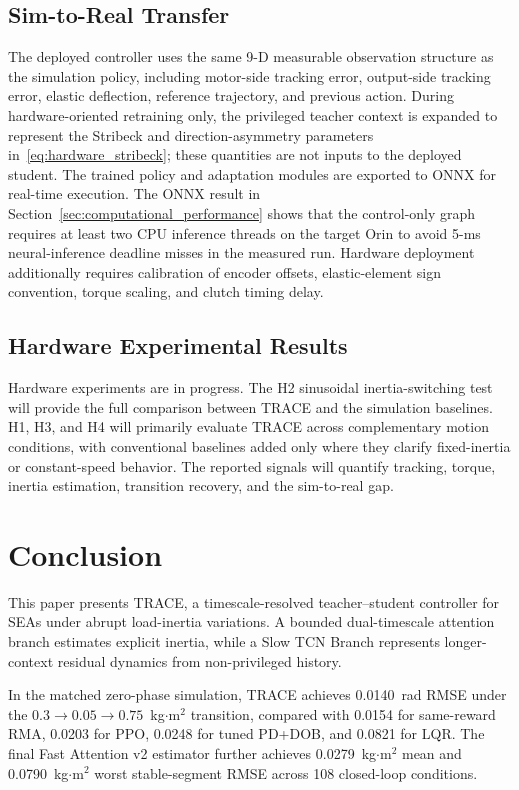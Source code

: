 \documentclass[letterpaper,journal]{IEEEtran}
\begin{document}
\subsection{Sim-to-Real Transfer}

The deployed controller uses the same 9-D measurable observation structure as the simulation policy, including motor-side tracking error, output-side tracking error, elastic deflection, reference trajectory, and previous action. During hardware-oriented retraining only, the privileged teacher context is expanded to represent the Stribeck and direction-asymmetry parameters in~\eqref{eq:hardware_stribeck}; these quantities are not inputs to the deployed student. The trained policy and adaptation modules are exported to ONNX for real-time execution. The ONNX result in Section~\ref{sec:computational_performance} shows that the control-only graph requires at least two CPU inference threads on the target Orin to avoid 5-ms neural-inference deadline misses in the measured run. Hardware deployment additionally requires calibration of encoder offsets, elastic-element sign convention, torque scaling, and clutch timing delay.

\subsection{Hardware Experimental Results}

Hardware experiments are in progress. The H2 sinusoidal inertia-switching test will provide the full comparison between TRACE and the simulation baselines. H1, H3, and H4 will primarily evaluate TRACE across complementary motion conditions, with conventional baselines added only where they clarify fixed-inertia or constant-speed behavior. The reported signals will quantify tracking, torque, inertia estimation, transition recovery, and the sim-to-real gap.

\section{Conclusion}

This paper presents TRACE, a timescale-resolved teacher--student controller for SEAs under abrupt load-inertia variations. A bounded dual-timescale attention branch estimates explicit inertia, while a Slow TCN Branch represents longer-context residual dynamics from non-privileged history.

In the matched zero-phase simulation, TRACE achieves 0.0140~rad RMSE under the $0.3\rightarrow0.05\rightarrow0.75$~kg$\cdot$m$^2$ transition, compared with 0.0154 for same-reward RMA, 0.0203 for PPO, 0.0248 for tuned PD+DOB, and 0.0821 for LQR. The final Fast Attention v2 estimator further achieves 0.0279~kg$\cdot$m$^2$ mean and 0.0790~kg$\cdot$m$^2$ worst stable-segment RMSE across 108 closed-loop conditions.
\end{document}
